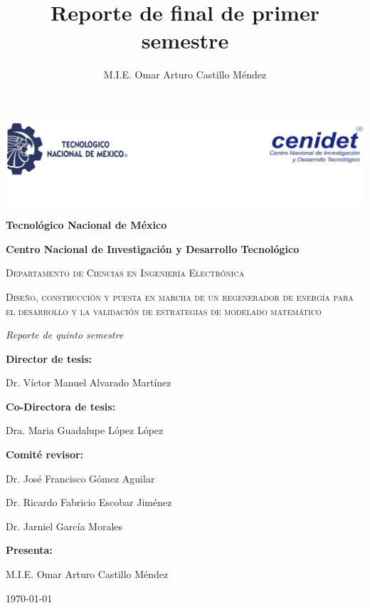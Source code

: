 \documentclass[12pt,letterpaper,final]{article}%
\title{Reporte de final de primer semestre}
\date{}
\author{M.I.E. Omar Arturo Castillo M\'endez}
\begin{document}
	\begin{titlepage}%
		\centering
		\includegraphics[scale=1]{logo}
		\vspace{0.1cm}
		{\bfseries\LARGE Tecnol\'ogico Nacional de M\'exico \par}
		{\bfseries\LARGE Centro Nacional de Investigaci\'on y Desarrollo Tecnol\'ogico \par}
		\vspace{0.25cm}
		{\scshape\Large Departamento de Ciencias en Ingenier\'ia Electr\'onica \par}
		\vspace{0.25cm}
		{\scshape\Large Diseño, construcci\'on y puesta en marcha de un regenerador de energ\'ia para el desarrollo y la validaci\'on de estrategias de modelado matem\'atico \par}
		\vspace{0.25cm}
		{\itshape\Large Reporte de quinto semestre  \par}
		\vspace{0.25cm}
		{\bfseries Director de tesis: \par}
		\vspace{0.2cm}
		{Dr. V\'ictor Manuel Alvarado Mart\'inez \par}
		\vspace{0.2cm}
		{\bfseries Co-Directora de tesis: \par}
		\vspace{0.2cm}
		{Dra. Maria Guadalupe L\'opez L\'opez \par}
		\vspace{0.2cm}
		{\bfseries Comit\'e revisor: \par}
		\vspace{0.2cm}
		{Dr. Jos\'e Francisco G\'omez Aguilar \par}
		\vspace{0.2cm}
		{Dr. Ricardo Fabricio Escobar Jim\'enez  \par}
		\vspace{0.2cm}
		{Dr. Jarniel Garc\'ia Morales \par}
		\vspace{0.2cm}
		{\bfseries Presenta: \par}
		{M.I.E. Omar Arturo Castillo M\'endez \par}
		\vspace{0.2cm}
		{\today \par}
	\end{titlepage}
	\tableofcontents{\thispagestyle{empty}}
	\newpage
	\setcounter{page}{1}
\end{document}
